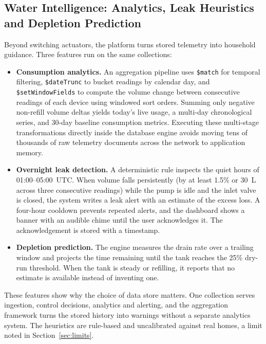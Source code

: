 \documentclass[11pt,a4paper]{article}
\begin{document}
\subsection{Water Intelligence: Analytics, Leak Heuristics and Depletion Prediction}
Beyond switching actuators, the platform turns stored telemetry into household guidance. Three features run on the same collections:
\begin{itemize}[noitemsep]
\item \textbf{Consumption analytics.} An aggregation pipeline uses \texttt{\$match} for temporal filtering, \texttt{\$dateTrunc} to bucket readings by calendar day, and \texttt{\$setWindowFields} to compute the volume change between consecutive readings of each device using windowed sort orders. Summing only negative non-refill volume deltas yields today's live usage, a multi-day chronological series, and 30-day baseline consumption metrics. Executing these multi-stage transformations directly inside the database engine avoids moving tens of thousands of raw telemetry documents across the network to application memory.
\item \textbf{Overnight leak detection.} A deterministic rule inspects the quiet hours of 01:00--05:00~UTC. When volume falls persistently (by at least 1.5\% or 30~L across three consecutive readings) while the pump is idle and the inlet valve is closed, the system writes a leak alert with an estimate of the excess loss. A four-hour cooldown prevents repeated alerts, and the dashboard shows a banner with an audible chime until the user acknowledges it. The acknowledgement is stored with a timestamp.
\item \textbf{Depletion prediction.} The engine measures the drain rate over a trailing window and projects the time remaining until the tank reaches the 25\% dry-run threshold. When the tank is steady or refilling, it reports that no estimate is available instead of inventing one.
\end{itemize}
These features show why the choice of data store matters. One collection serves ingestion, control decisions, analytics and alerting, and the aggregation framework turns the stored history into warnings without a separate analytics system. The heuristics are rule-based and uncalibrated against real homes, a limit noted in Section~\ref{sec:limits}.

\FloatBarrier
\end{document}
